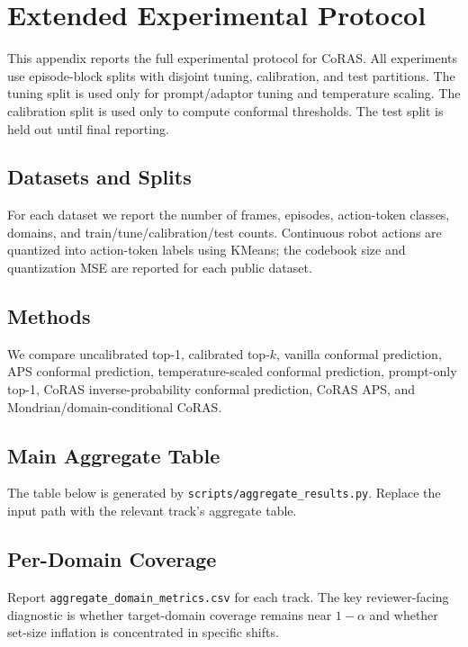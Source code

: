 \section{Extended Experimental Protocol}

This appendix reports the full experimental protocol for CoRAS. All experiments use episode-block splits with disjoint tuning, calibration, and test partitions. The tuning split is used only for prompt/adaptor tuning and temperature scaling. The calibration split is used only to compute conformal thresholds. The test split is held out until final reporting.

\subsection{Datasets and Splits}

For each dataset we report the number of frames, episodes, action-token classes, domains, and train/tune/calibration/test counts. Continuous robot actions are quantized into action-token labels using KMeans; the codebook size and quantization MSE are reported for each public dataset.

\subsection{Methods}

We compare uncalibrated top-1, calibrated top-$k$, vanilla conformal prediction, APS conformal prediction, temperature-scaled conformal prediction, prompt-only top-1, CoRAS inverse-probability conformal prediction, CoRAS APS, and Mondrian/domain-conditional CoRAS.

\subsection{Main Aggregate Table}

The table below is generated by \texttt{scripts/aggregate\_results.py}. Replace the input path with the relevant track's aggregate table.



\subsection{Per-Domain Coverage}

Report \texttt{aggregate\_domain\_metrics.csv} for each track. The key reviewer-facing diagnostic is whether target-domain coverage remains near $1-\alpha$ and whether set-size inflation is concentrated in specific shifts.

